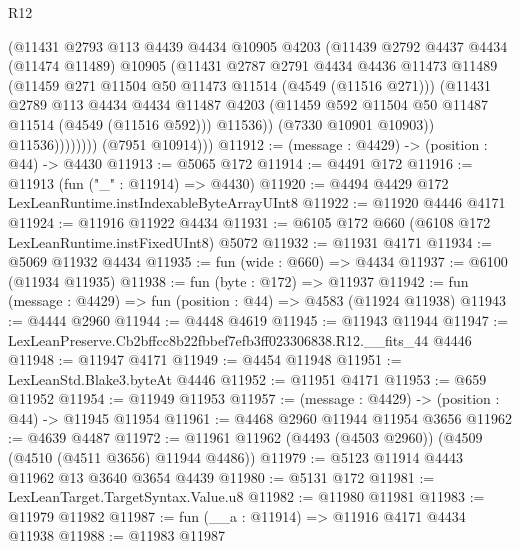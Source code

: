 \begin{lexlean}{R12}
\begin{coremodule}
                      (@11431
                        @2793
                        @113
                        @4439
                        @4434
                        @10905
                        @4203
                        (@11439
                          @2792
                          @4437
                          @4434
                          (@11474 @11489)
                          @10905
                          (@11431
                            @2787
                            @2791
                            @4434
                            @4436
                            @11473
                            @11489
                            (@11459 @271 @11504 @50 @11473 @11514 (@4549 (@11516 @271)))
                            (@11431
                              @2789
                              @113
                              @4434
                              @4434
                              @11487
                              @4203
                              (@11459 @592 @11504 @50 @11487 @11514 (@4549 (@11516 @592)))
                              @11536))
                          (@7330 @10901 @10903))
                        @11536))))))))
        (@7951 @10914)))
@11912 := (message : @4429) -> (position : @44) -> @4430
@11913 := @5065 @172
@11914 := @4491 @172
@11916 := @11913 (fun ("_" : @11914) => @4430)
@11920 := @4494 @4429 @172 LexLeanRuntime.instIndexableByteArrayUInt8
@11922 := @11920 @4446 @4171
@11924 := @11916 @11922 @4434
@11931 := @6105 @172 @660 (@6108 @172 LexLeanRuntime.instFixedUInt8) @5072
@11932 := @11931 @4171
@11934 := @5069 @11932 @4434
@11935 := fun (wide : @660) => @4434
@11937 := @6100 (@11934 @11935)
@11938 := fun (byte : @172) => @11937
@11942 := fun (message : @4429) => fun (position : @44) => @4583 (@11924 @11938)
@11943 := @4444 @2960
@11944 := @4448 @4619
@11945 := @11943 @11944
@11947 := LexLeanPreserve.Cb2bffcc8b22fbbef7efb3ff023306838.R12.__fits_44 @4446
@11948 := @11947 @4171
@11949 := @4454 @11948
@11951 := LexLeanStd.Blake3.byteAt @4446
@11952 := @11951 @4171
@11953 := @659 @11952
@11954 := @11949 @11953
@11957 := (message : @4429) -> (position : @44) -> @11945 @11954
@11961 := @4468 @2960 @11944 @11954 @3656
@11962 := @4639 @4487
@11972 := @11961 @11962 (@4493 (@4503 @2960)) (@4509 (@4510 (@4511 @3656) @11944 @4486))
@11979 := @5123 @11914 @4443 @11962 @13 @3640 @3654 @4439
@11980 := @5131 @172
@11981 := LexLeanTarget.TargetSyntax.Value.u8
@11982 := @11980 @11981
@11983 := @11979 @11982
@11987 := fun (__a : @11914) => @11916 @4171 @4434 @11938
@11988 := @11983 @11987

\end{coremodule}
\end{lexlean}
